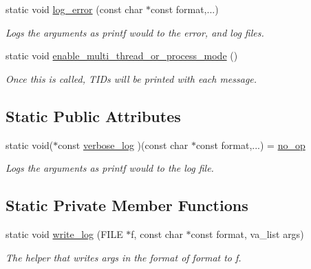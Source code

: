 \begin{DoxyCompactItemize}
static void \hyperlink{class_utilities_a48952d33b9dc4fba9846dbc7a12df2f1}{log\+\_\+error} (const char $\ast$const format,...)
\begin{DoxyCompactList}\small\item\em Logs the arguments as printf would to the error, and log files. \end{DoxyCompactList}\item 
static void \hyperlink{class_utilities_a384728ae9b72982c1351d881ba7ff007}{enable\+\_\+multi\+\_\+thread\+\_\+or\+\_\+process\+\_\+mode} ()
\begin{DoxyCompactList}\small\item\em Once this is called, T\+I\+Ds will be printed with each message. \end{DoxyCompactList}\end{DoxyCompactItemize}
\subsection*{Static Public Attributes}
\begin{DoxyCompactItemize}
\item 
static void($\ast$const \hyperlink{class_utilities_aea2455488648f9acb6f72dea878b3782}{verbose\+\_\+log} )(const char $\ast$const format,...) = \hyperlink{utilities_8cpp_a1c9ff67441d2537fadf0f0d8a655448e}{no\+\_\+op}
\begin{DoxyCompactList}\small\item\em Logs the arguments as printf would to the log file. \end{DoxyCompactList}\end{DoxyCompactItemize}
\subsection*{Static Private Member Functions}
\begin{DoxyCompactItemize}
\item 
static void \hyperlink{class_utilities_abaeaa0c9f6d7b525ac080045f789d2e2}{write\+\_\+log} (F\+I\+LE $\ast$f, const char $\ast$const format, va\+\_\+list args)
\begin{DoxyCompactList}\small\item\em The helper that writes args in the format of format to f. \end{DoxyCompactList}\end{DoxyCompactItemize}
